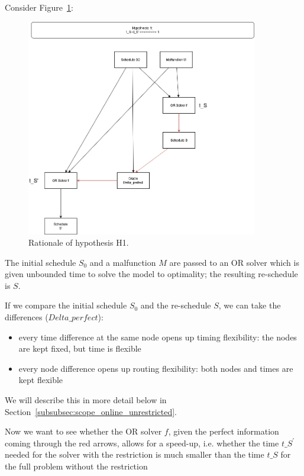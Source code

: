 \documentclass{article}
\begin{document}
Consider Figure~\ref{fig:introduction_H1}:
%
\begin{figure}[hbtp]
	\centering
  \includegraphics[width=0.9\textwidth]{introduction_H1.png}
	\caption{Rationale of hypothesis H1.}
	\label{fig:introduction_H1}
\end{figure}
%
The initial schedule $S_0$ and a malfunction $M$ are passed to an OR solver which is given unbounded time to solve the model to optimality; the resulting re-schedule is $S$.

If we compare the initial schedule $S_0$ and the re-schedule $S$, we can take the differences ($Delta\_perfect$):

\begin{itemize}
    \item     every time difference at the same node opens up timing flexibility: the nodes are kept fixed, but time is flexible
    \item every node difference opens up routing flexibility: both nodes and times are kept flexible
\end{itemize}
We will describe this in more detail below in Section~\ref{subsubsec:scope_online_unrestricted}.


Now we want to see whether the OR solver $f$, given the perfect information coming through the red arrows, allows for a speed-up, i.e. whether the time $t\_{S^\prime}$  needed for the solver with the restriction is much smaller than the time $t\_S$ for the full problem without the restriction
\end{document}
